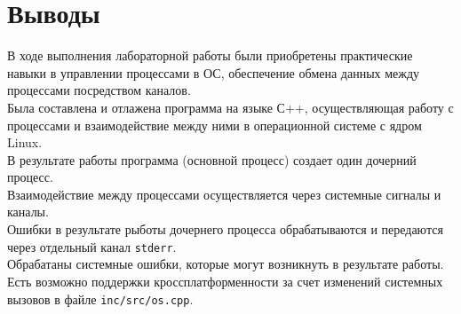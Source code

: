 \section{Выводы}
В ходе выполнения лабораторной работы были приобретены практические навыки в управлении процессами в ОС, обеспечение обмена данных между процессами посредством каналов. \\
Была составлена и отлажена программа на языке С++, осуществляющая работу с процессами и взаимодействие между ними в операционной системе с ядром Linux. \\
В результате работы программа (основной процесс) создает один дочерний процесс. \\
Взаимодействие между процессами осуществляется через системные сигналы и каналы. \\
Ошибки в результате рыботы дочернего процесса обрабатываются и передаются через отдельный канал \texttt{stderr}. \\
Обрабатаны системные ошибки, которые могут возникнуть в результате работы. \\
Есть возможно поддержки кроссплатформенности за счет изменений системных вызовов в файле \texttt{inc/src/os.cpp}.
\pagebreak